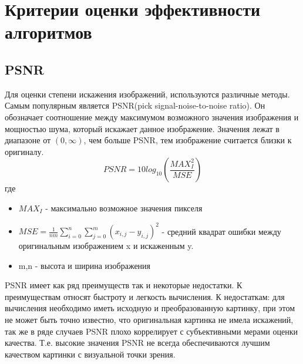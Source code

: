 \section{Критерии оценки эффективности алгоритмов}
\subsection{PSNR}
Для оценки степени искажения изображений, используются различные методы. Самым популярным является PSNR(pick signal-noise-to-noise ratio). Он обозначает соотношение между максимумом возможного значения изображения и мощностью шума, который искажает данное изображение. Значения лежат в диапазоне от $(0, \infty)$, чем больше PSNR, тем изображение считается близки к оригиналу.
\begin{equation}\label{eq:PSNR}
PSNR = 10log_{10}(\frac{MAX_I^2}{MSE})
\end{equation}
где 
\begin{itemize}
	\item $MAX_I$ - максимально возможное значения пикселя
	\item $MSE = \frac{1}{nm}\sum_{i=0}^{n}\sum_{j=0}^{m}(x_{i,j} - y_{i,j})^2$ - средний квадрат ошибки между оригинальным изображением x и искаженным y.
	\item m,n - высота и ширина изображения
\end{itemize}
PSNR имеет как ряд преимуществ так и некоторые недостатки. К преимуществам относят быстроту и легкость вычисления. К недостаткам: для вычисления необходимо иметь исходную и преобразованную картинку, при этом не может быть точно известно, что  оригинальная картинка не имела искажений, так же в ряде случаев PSNR плохо коррелирует с субъективными мерами оценки  качества. Т.е. высокие значения PSNR не всегда обеспечиваются лучшим качеством картинки с визуальной точки зрения.
